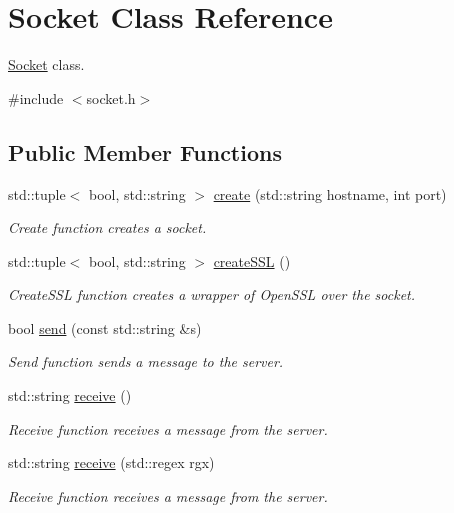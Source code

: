 \hypertarget{classSocket}{}\section{Socket Class Reference}
\label{classSocket}


\hyperlink{classSocket}{Socket} class.  




{\ttfamily \#include $<$socket.\+h$>$}

\subsection*{Public Member Functions}
\begin{DoxyCompactItemize}
\item 
std\+::tuple$<$ bool, std\+::string $>$ \hyperlink{classSocket_a5bea2a5422628c243dda71607bc34e7b}{create} (std\+::string hostname, int port)
\begin{DoxyCompactList}\small\item\em Create function creates a socket. \end{DoxyCompactList}\item 
std\+::tuple$<$ bool, std\+::string $>$ \hyperlink{classSocket_a4af3d26d591ec86509d7ea7a700e4c66}{create\+S\+SL} ()
\begin{DoxyCompactList}\small\item\em Create\+S\+SL function creates a wrapper of Open\+S\+SL over the socket. \end{DoxyCompactList}\item 
bool \hyperlink{classSocket_a51839591e6a25799d62170ac8b105348}{send} (const std\+::string \&s)
\begin{DoxyCompactList}\small\item\em Send function sends a message to the server. \end{DoxyCompactList}\item 
std\+::string \hyperlink{classSocket_a93675446d84c9856a4d7493f99d1e064}{receive} ()
\begin{DoxyCompactList}\small\item\em Receive function receives a message from the server. \end{DoxyCompactList}\item 
std\+::string \hyperlink{classSocket_af96bcd8ddc3bc16f451a6142fff0ddde}{receive} (std\+::regex rgx)
\begin{DoxyCompactList}\small\item\em Receive function receives a message from the server. \end{DoxyCompactList}\end{DoxyCompactItemize}


